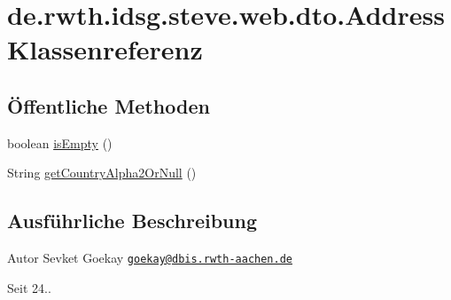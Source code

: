\hypertarget{classde_1_1rwth_1_1idsg_1_1steve_1_1web_1_1dto_1_1_address}{\section{de.\+rwth.\+idsg.\+steve.\+web.\+dto.\+Address Klassenreferenz}
\label{classde_1_1rwth_1_1idsg_1_1steve_1_1web_1_1dto_1_1_address}
}
\subsection*{Öffentliche Methoden}
\begin{DoxyCompactItemize}
\item 
boolean \hyperlink{classde_1_1rwth_1_1idsg_1_1steve_1_1web_1_1dto_1_1_address_a668f749a007b2fd494a6206a4a86c062}{is\+Empty} ()
\item 
String \hyperlink{classde_1_1rwth_1_1idsg_1_1steve_1_1web_1_1dto_1_1_address_a09d304dc9f01c98b9753c999f79dc427}{get\+Country\+Alpha2\+Or\+Null} ()
\end{DoxyCompactItemize}


\subsection{Ausführliche Beschreibung}
\begin{DoxyAuthor}{Autor}
Sevket Goekay \href{mailto:goekay@dbis.rwth-aachen.de}{\tt goekay@dbis.\+rwth-\/aachen.\+de} 
\end{DoxyAuthor}
\begin{DoxySince}{Seit}
24.. 
\end{DoxySince}


